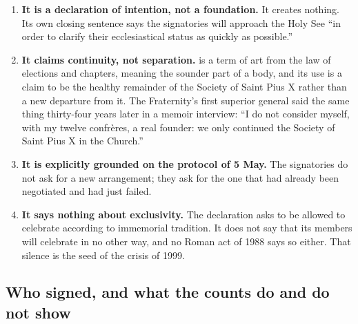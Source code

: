 \begin{enumerate}
\item \textbf{It is a declaration of intention, not a foundation.} It
creates nothing. Its own closing sentence says the signatories will
approach the Holy See ``in order to clarify their ecclesiastical status
as quickly as possible.''
\item \textbf{It claims continuity, not separation.} 
is a term of art from the law of elections and chapters, meaning the
sounder part of a body, and its use is a claim to be the healthy
remainder of the Society of Saint Pius X rather than a new departure from
it. The Fraternity's first superior general said the same thing
thirty-four years later in a memoir interview: ``I do not consider myself,
with my twelve confrères, a real founder: we only continued the Society
of Saint Pius X in the Church.''
\item \textbf{It is explicitly grounded on the protocol of 5 May.} The
signatories do not ask for a new arrangement; they ask for the one that
had already been negotiated and had just failed.
\item \textbf{It says nothing about exclusivity.} The declaration asks
to be allowed to celebrate according to immemorial tradition. It does not
say that its members will celebrate in no other way, and no Roman act of
1988 says so either. That silence is the seed of the crisis of 1999.
\end{enumerate}

\subsection{Who signed, and what the counts do and do not show}

